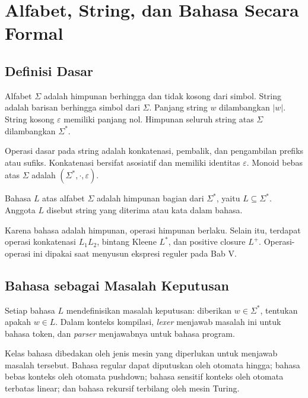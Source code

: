 \section{Alfabet, String, dan Bahasa Secara Formal}
\label{sec:ch04-bahasa}

\subsection{Definisi Dasar}

\begin{definisi}
Alfabet \(\Sigma\) adalah himpunan berhingga dan tidak kosong dari
simbol. String adalah barisan berhingga simbol dari \(\Sigma\).
Panjang string \(w\) dilambangkan \(|w|\). String kosong
\(\varepsilon\) memiliki panjang nol. Himpunan seluruh string atas
\(\Sigma\) dilambangkan \(\Sigma^{*}\).
\end{definisi}

Operasi dasar pada string adalah konkatenasi, pembalik, dan
pengambilan prefiks atau sufiks. Konkatenasi bersifat asosiatif dan
memiliki identitas \(\varepsilon\). Monoid bebas atas \(\Sigma\)
adalah \((\Sigma^{*}, \cdot, \varepsilon)\).

\begin{definisi}[Bahasa]
Bahasa \(L\) atas alfabet \(\Sigma\) adalah himpunan bagian dari
\(\Sigma^{*}\), yaitu \(L \subseteq \Sigma^{*}\). Anggota \(L\)
disebut string yang diterima atau kata dalam bahasa.
\end{definisi}

Karena bahasa adalah himpunan, operasi himpunan berlaku. Selain itu,
terdapat operasi konkatenasi \(L_1L_2\), bintang Kleene \(L^{*}\),
dan positive closure \(L^{+}\). Operasi-operasi ini dipakai
saat menyusun ekspresi reguler pada Bab V.

\subsection{Bahasa sebagai Masalah Keputusan}

Setiap bahasa \(L\) mendefinisikan masalah keputusan: diberikan
\(w \in \Sigma^{*}\), tentukan apakah \(w \in L\). Dalam konteks
kompilasi, \emph{lexer} menjawab masalah ini untuk bahasa token, dan
\emph{parser} menjawabnya untuk bahasa program.

Kelas bahasa dibedakan oleh jenis mesin yang diperlukan untuk
menjawab masalah tersebut. Bahasa regular dapat diputuskan oleh
otomata hingga; bahasa bebas konteks oleh otomata pushdown; bahasa
sensitif konteks oleh otomata terbatas linear; dan bahasa rekursif
terbilang oleh mesin Turing.

